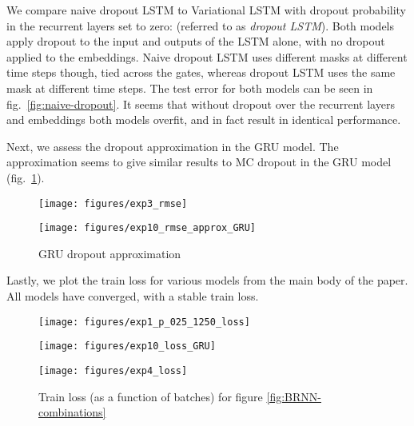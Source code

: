 \documentclass{article}
\theoremstyle{definition}
\begin{document}
We compare naive dropout LSTM to Variational LSTM with dropout probability in the recurrent layers set to zero:  (referred to as \textit{dropout LSTM}). Both models apply dropout to the input and outputs of the LSTM alone, with no dropout applied to the embeddings. Naive dropout LSTM uses different masks at different time steps though, tied across the gates, whereas dropout LSTM uses the same mask at different time steps. 
The test error for both models can be seen in fig.\ \ref{fig:naive-dropout}.
It seems that without dropout over the recurrent layers  and embeddings both models overfit, and in fact result in identical performance.

Next, we assess the dropout approximation in the GRU model. The approximation seems to give similar results to MC dropout in the GRU model (fig.\ \ref{fig:exp10_rmse_approx_GRU}). 

\begin{figure}[h!]
\center
\begin{minipage}{0.49\linewidth}
\texttt{[image: figures/exp3\_rmse]}
\caption{\textit{Naive dropout LSTM} uses different dropout masks at each time step, whereas \textit{Dropout LSTM} uses the same mask at each time step. Both models apply dropout to the inputs and outputs alone, and result in identical performance.}
\label{fig:naive-dropout}
\end{minipage}
\begin{minipage}{0.49\linewidth}
\texttt{[image: figures/exp10\_rmse\_approx\_GRU]}
\caption{GRU dropout approximation}
\label{fig:exp10_rmse_approx_GRU}
\end{minipage}
\end{figure}

Lastly, we plot the train loss for various models from the main body of the paper. All models have converged, with a stable train loss.

\begin{figure}[h!]
\center
\begin{minipage}{0.32\linewidth}
\texttt{[image: figures/exp1\_p\_025\_1250\_loss]}
\caption{Train loss (as a function of batches) for figure \ref{fig:BLSTM-a}}
\end{minipage}
\begin{minipage}{0.32\linewidth}
\texttt{[image: figures/exp10\_loss\_GRU]}
\caption{\label{fig:BGRU-a}GRU train loss (as a function of batches) (figure \ref{fig:BGRU-a})}
\end{minipage}
\begin{minipage}{0.32\linewidth}
\texttt{[image: figures/exp4\_loss]}
\caption{Train loss (as a function of batches) for figure \ref{fig:BRNN-combinations}}
\end{minipage}
\end{figure}
\end{document}
